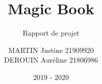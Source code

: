 \documentclass[report]{BetterDocument}
\title{Magic Book}
\subtitle{Rapport de projet}
\author{MARTIN Justine 21909920\\
	DEROUIN Auréline 21806986
}
\date{2019 - 2020}
\institute{Unicaen}
\begin{document}
	\pageDeGarde

	\tableDesMatieres

	

	

	

	

	
\end{document}
